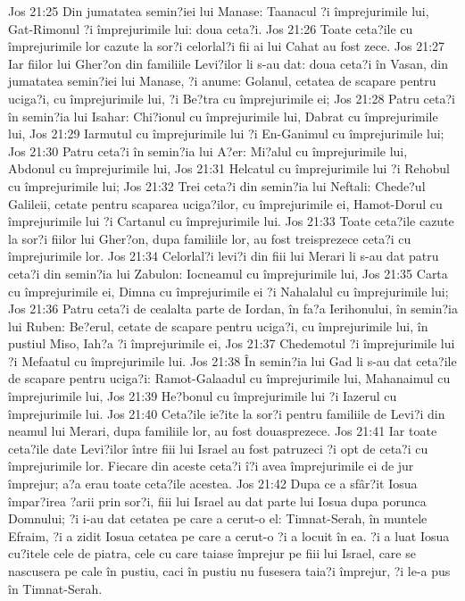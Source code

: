 Jos 21:25  Din jumatatea semin?iei lui Manase: Taanacul ?i împrejurimile lui, Gat-Rimonul ?i împrejurimile lui: doua ceta?i.
Jos 21:26  Toate ceta?ile cu împrejurimile lor cazute la sor?i celorlal?i fii ai lui Cahat au fost zece.
Jos 21:27  Iar fiilor lui Gher?on din familiile Levi?ilor li s-au dat: doua ceta?i în Vasan, din jumatatea semin?iei lui Manase, ?i anume: Golanul, cetatea de scapare pentru uciga?i, cu împrejurimile lui, ?i Be?tra cu împrejurimile ei;
Jos 21:28  Patru ceta?i în semin?ia lui Isahar: Chi?ionul cu împrejurimile lui, Dabrat cu împrejurimile lui,
Jos 21:29  Iarmutul cu împrejurimile lui ?i En-Ganimul cu împrejurimile lui;
Jos 21:30  Patru ceta?i în semin?ia lui A?er: Mi?alul cu împrejurimile lui, Abdonul cu împrejurimile lui,
Jos 21:31  Helcatul cu împrejurimile lui ?i Rehobul cu împrejurimile lui;
Jos 21:32  Trei ceta?i din semin?ia lui Neftali: Chede?ul Galileii, cetate pentru scaparea uciga?ilor, cu împrejurimile ei, Hamot-Dorul cu împrejurimile lui ?i Cartanul cu împrejurimile lui.
Jos 21:33  Toate ceta?ile cazute la sor?i fiilor lui Gher?on, dupa familiile lor, au fost treisprezece ceta?i cu împrejurimile lor.
Jos 21:34  Celorlal?i levi?i din fiii lui Merari li s-au dat patru ceta?i din semin?ia lui Zabulon: Iocneamul cu împrejurimile lui,
Jos 21:35  Carta cu împrejurimile ei, Dimna cu împrejurimile ei ?i Nahalalul cu împrejurimile lui;
Jos 21:36  Patru ceta?i de cealalta parte de Iordan, în fa?a Ierihonului, în semin?ia lui Ruben: Be?erul, cetate de scapare pentru uciga?i, cu împrejurimile lui, în pustiul Miso, Iah?a ?i împrejurimile ei,
Jos 21:37  Chedemotul ?i împrejurimile lui ?i Mefaatul cu împrejurimile lui.
Jos 21:38  În semin?ia lui Gad li s-au dat ceta?ile de scapare pentru uciga?i: Ramot-Galaadul cu împrejurimile lui, Mahanaimul cu împrejurimile lui,
Jos 21:39  He?bonul cu împrejurimile lui ?i Iazerul cu împrejurimile lui.
Jos 21:40  Ceta?ile ie?ite la sor?i pentru familiile de Levi?i din neamul lui Merari, dupa familiile lor, au fost douasprezece.
Jos 21:41  Iar toate ceta?ile date Levi?ilor între fiii lui Israel au fost patruzeci ?i opt de ceta?i cu împrejurimile lor. Fiecare din aceste ceta?i î?i avea împrejurimile ei de jur împrejur; a?a erau toate ceta?ile acestea.
Jos 21:42  Dupa ce a sfâr?it Iosua împar?irea ?arii prin sor?i, fiii lui Israel au dat parte lui Iosua dupa porunca Domnului; ?i i-au dat cetatea pe care a cerut-o el: Timnat-Serah, în muntele Efraim, ?i a zidit Iosua cetatea pe care a cerut-o ?i a locuit în ea. ?i a luat Iosua cu?itele cele de piatra, cele cu care taiase împrejur pe fiii lui Israel, care se nascusera pe cale în pustiu, caci în pustiu nu fusesera taia?i împrejur, ?i le-a pus în Timnat-Serah.
